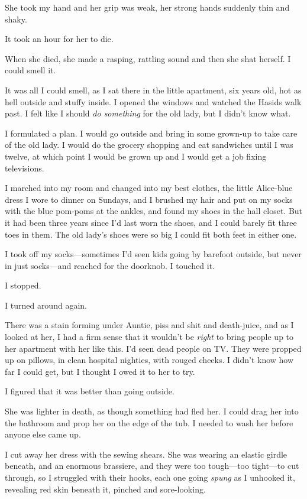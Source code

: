 \documentclass{article}
\begin{document}
She took my hand and her grip was weak, her strong hands suddenly thin
and shaky.

It took an hour for her to die.

When she died, she made a rasping, rattling sound and then she shat
herself.  I could smell it.

It was all I could smell, as I sat there in the little apartment, six
years old, hot as hell outside and stuffy inside.  I opened the
windows and watched the Hasids walk past.  I felt like I should
\textit{do something} for the old lady, but I didn't know what.

I formulated a plan.  I would go outside and bring in some grown-up to
take care of the old lady.  I would do the grocery shopping and eat
sandwiches until I was twelve, at which point I would be grown up and
I would get a job fixing televisions.

I marched into my room and changed into my best clothes, the little
Alice-blue dress I wore to dinner on Sundays, and I brushed my hair
and put on my socks with the blue pom-poms at the ankles, and found my
shoes in the hall closet.  But it had been three years since I'd last
worn the shoes, and I could barely fit three toes in them.  The old
lady's shoes were so big I could fit both feet in either one.

I took off my socks---sometimes I'd seen kids going by barefoot
outside, but never in just socks---and reached for the doorknob.  I
touched it.

I stopped.

I turned around again.

There was a stain forming under Auntie, piss and shit and death-juice,
and as I looked at her, I had a firm sense that it wouldn't be
\textit{right} to bring people up to her apartment with her like this. 
I'd seen dead people on TV.  They were propped up on pillows, in clean
hospital nighties, with rouged cheeks.  I didn't know how far I could
get, but I thought I owed it to her to try.

I figured that it was better than going outside.

She was lighter in death, as though something had fled her.  I could
drag her into the bathroom and prop her on the edge of the tub.  I
needed to wash her before anyone else came up.

I cut away her dress with the sewing shears.  She was wearing an
elastic girdle beneath, and an enormous brassiere, and they were too
tough---too tight---to cut through, so I struggled with their hooks,
each one going \textit{spung} as I unhooked it, revealing red skin
beneath it, pinched and sore-looking.
\end{document}
